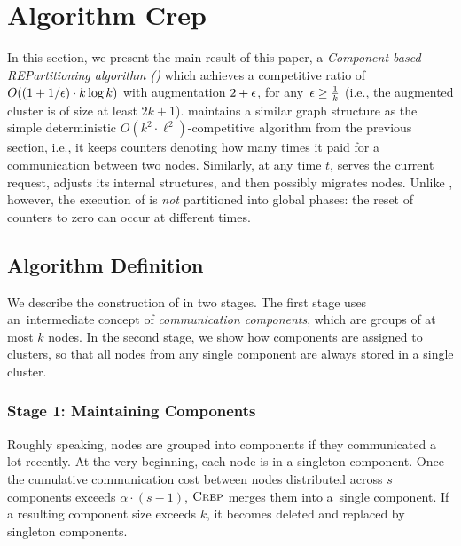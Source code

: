 
\section{Algorithm {\sc Crep}}
\label{sec:crep}

In this section, we present the main result of this paper, a
\emph{Component-based REPartitioning algorithm (\CREP)} which achieves a
competitive ratio of $O((1 + 1/\epsilon) \cdot k \log k)$ with augmentation
$2+\epsilon$, for any~$\epsilon \geq \frac{1}{k}$ (i.e., the augmented cluster
is of size at least $2k+1$). \CREP maintains a similar graph structure as the
simple deterministic $O(k^2 \cdot \ell^2)$-competitive algorithm from the
previous section, i.e., it keeps counters denoting how many times it paid for a
communication between two nodes. Similarly, at any time $t$,
\CREP serves the current request, adjusts its internal structures, and then
possibly migrates nodes. Unlike \DET, however, the execution of \CREP is
\emph{not} partitioned into global phases: the reset of counters to zero can
occur at different times.


\subsection{Algorithm Definition}

We describe the construction of \CREP in two stages. The first stage uses
an~intermediate concept of \emph{communication components}, which are groups of at
most $k$ nodes. In the second stage, we show how components are assigned to
clusters, so that all nodes from any single component are always stored in a
single cluster.


\subsubsection{Stage 1: Maintaining Components}

Roughly speaking, nodes are grouped into components if they communicated a lot
recently. At the very beginning, each node is in a singleton component. Once
the cumulative communication cost between nodes distributed across $s$
components exceeds $\alpha \cdot (s-1)$, $\textsc{Crep}$ merges them into a~single
component. If a resulting component size exceeds $k$, it becomes deleted and
replaced by singleton components.

